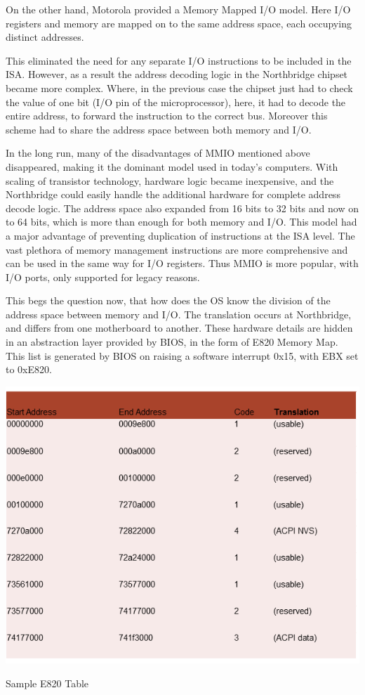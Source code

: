 On the other hand, Motorola provided a Memory Mapped I/O model. Here I/O registers and memory are mapped on to the same address space, each occupying distinct addresses.

This eliminated the need for any separate I/O instructions to be included in the ISA. However, as a result the address decoding logic in the Northbridge chipset became more complex. Where, in the previous case the chipset just had to check the value of one bit (I/O pin of the microprocessor), here, it had to decode the entire address, to forward the instruction to the correct bus. Moreover this scheme had to share the address space between both memory and I/O.

In the long run, many of the disadvantages of MMIO mentioned above disappeared, making it the dominant model used in today's computers. With scaling of transistor technology, hardware logic became inexpensive, and the Northbridge could easily handle the additional hardware for complete address decode logic. The address space also expanded from 16 bits to 32 bits and now on to 64 bits, which is more than enough for both memory and I/O. This model had a major advantage of preventing duplication of instructions at the ISA level. The vast plethora of memory management instructions are more comprehensive and can be used in the same way for I/O registers. Thus MMIO is more popular, with I/O ports, only supported for legacy reasons. 


This begs the question now, that how does the OS know the division of the address space between memory and I/O. The translation occurs at Northbridge, and differs from one motherboard to another. These hardware details are hidden in an abstraction layer provided by BIOS, in the form of E820 Memory Map. This list is generated by BIOS on raising a software interrupt 0x15, with EBX set to 0xE820. 


\setlength{\belowcaptionskip}{-10pt}

\begin{table}[H]
  \centering
  \includegraphics[scale=0.6]{figures/e820table.png}
  \caption{Sample E820 Table}
  \label{fig:e820table}
\end{table}

